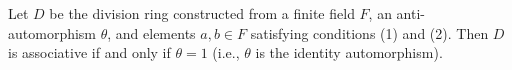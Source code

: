 Let $D$ be the division ring constructed from a finite field $F$, an anti-automorphism $\theta$, and elements $a, b \in F$ satisfying conditions (1) and (2). Then $D$ is associative if and only if $\theta = 1$ (i.e., $\theta$ is the identity automorphism).